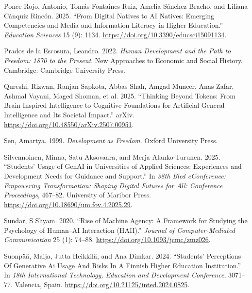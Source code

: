 \documentclass[
  letterpaper,
  DIV=11,
  numbers=noendperiod]{scrartcl}
\newlength{\cslhangindent}
\newenvironment{CSLReferences}[2] %
 {\begin{list}{}{%
  \setlength{\itemindent}{0pt}
  \setlength{\leftmargin}{0pt}
  \setlength{\parsep}{0pt}
  \ifodd #1
   \setlength{\leftmargin}{\cslhangindent}
   \setlength{\itemindent}{-1\cslhangindent}
  \fi
  \setlength{\itemsep}{#2\baselineskip}}}
 {\end{list}}
\begin{document}
\begin{CSLReferences}{1}{0}
Ponce Rojo, Antonio, Tomás Fontaines-Ruiz, Amelia Sánchez Bracho, and
Liliana Cánquiz Rincón. 2025. {``From {Digital Natives} to {AI Natives}:
{Emerging Competencies} and {Media} and {Information Literacy} in
{Higher Education}.''} \emph{Education Sciences} 15 (9): 1134.
\url{https://doi.org/10.3390/educsci15091134}.

Prados de la Escosura, Leandro. 2022. \emph{Human Development and the
Path to Freedom: 1870 to the Present}. New Approaches to Economic and
Social History. Cambridge: Cambridge University Press.

Qureshi, Rizwan, Ranjan Sapkota, Abbas Shah, Amgad Muneer, Anas Zafar,
Ashmal Vayani, Maged Shoman, et al. 2025. {``Thinking {Beyond Tokens}:
{From Brain-Inspired Intelligence} to {Cognitive Foundations} for
{Artificial General Intelligence} and Its {Societal Impact}.''} arXiv.
\url{https://doi.org/10.48550/arXiv.2507.00951}.

Sen, Amartya. 1999. \emph{Development as {Freedom}}. Oxford University
Press.

Silvennoinen, Minna, Satu Aksovaara, and Merja Alanko-Turunen. 2025.
{``Students' {Usage} of {GenAI} in {Universities} of {Applied Sciences}:
{Experiences} and {Development Needs} for {Guidance} and {Support}.''}
In \emph{38th {Bled eConference}: {Empowering Transformation}: {Shaping
Digital Futures} for {All}: {Conference Proceedings}}, 467--82.
University of Maribor Press.
\url{https://doi.org/10.18690/um.fov.4.2025.29}.

Sundar, S Shyam. 2020. {``Rise of {Machine Agency}: {A Framework} for
{Studying} the {Psychology} of {Human}--{AI Interaction} ({HAII}).''}
\emph{Journal of Computer-Mediated Communication} 25 (1): 74--88.
\url{https://doi.org/10.1093/jcmc/zmz026}.

Suonpää, Maija, Jutta Heikkilä, and Ana Dimkar. 2024. {``Students'
{Perceptions Of Generative Ai Usage And Risks In A Finnish Higher
Education Institution}.''} In \emph{18th {International Technology},
{Education} and {Development Conference}}, 3071--77. Valencia, Spain.
\url{https://doi.org/10.21125/inted.2024.0825}.


\end{CSLReferences}
\end{document}
